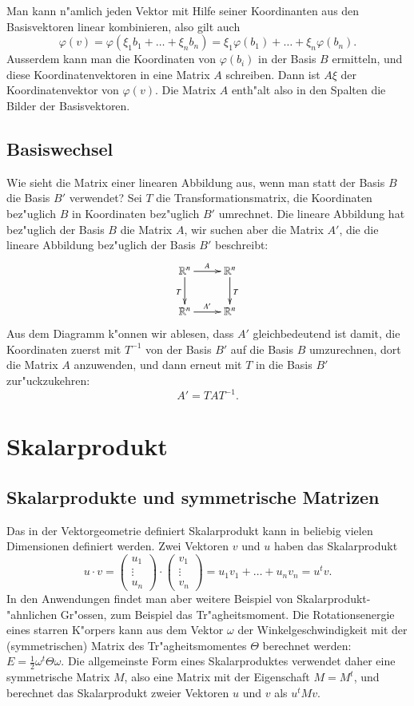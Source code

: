 Man kann n"amlich jeden Vektor mit Hilfe seiner Koordinanten aus
den Basisvektoren linear kombinieren, also gilt auch
\[
\varphi(v)
=
\varphi(\xi_1b_1+\dots+\xi_nb_n)
=
\xi_1\varphi(b_1)+\dots+\xi_n\varphi(b_n).
\]
Ausserdem kann man die Koordinaten von $\varphi(b_i)$ in der Basis
$B$ ermitteln, und diese Koordinatenvektoren in eine Matrix $A$
schreiben. Dann ist $A\xi$ der Koordinatenvektor von $\varphi(v)$.
Die Matrix $A$ enth"alt also in den Spalten die Bilder der Basisvektoren.

\subsection{Basiswechsel}
Wie sieht die Matrix einer linearen Abbildung aus, wenn man statt
der Basis $B$ die Basis $B'$ verwendet? Sei $T$ die Transformationsmatrix,
die Koordinaten bez"uglich $B$ in Koordinaten bez"uglich $B'$ umrechnet.
Die lineare Abbildung hat bez"uglich der Basis $B$ die Matrix $A$, wir
suchen aber die Matrix $A'$, die die lineare Abbildung bez"uglich der
Basis $B'$ beschreibt:
\[
\xymatrix{
\mathbb R^n\ar[r]^{A} \ar[d]_{T}
	&\mathbb R^n \ar[d]^{T}
\\
\mathbb R^n\ar[r]^{A'}
	&\mathbb R^n
}
\]
Aus dem Diagramm k"onnen wir ablesen, dass $A'$ gleichbedeutend
ist damit, die Koordinaten zuerst mit $T^{-1}$ von der Basis $B'$
auf die Basis $B$ umzurechnen, dort die Matrix $A$ anzuwenden, und
dann erneut mit $T$ in die Basis $B'$ zur"uckzukehren:
\begin{equation}
A'=TAT^{-1}.
\label{abbildung-basiswechsel}
\end{equation}

\section{Skalarprodukt}
\subsection{Skalarprodukte und symmetrische Matrizen}
Das in der Vektorgeometrie definiert Skalarprodukt kann in beliebig
vielen Dimensionen definiert werden. Zwei Vektoren $v$ und $u$ haben
das Skalarprodukt
\[
u\cdot v=
\begin{pmatrix}u_1\\\vdots\\u_n\end{pmatrix}
\cdot
\begin{pmatrix}v_1\\\vdots\\v_n\end{pmatrix}
=u_1v_1+\dots+u_nv_n=u^tv.
\]
In den Anwendungen findet man aber weitere Beispiel von
Skalarprodukt-"ahnlichen Gr"ossen, zum Beispiel das Tr"agheitsmoment.
Die Rotationsenergie eines starren K"orpers kann aus dem Vektor $\omega$
der Winkelgeschwindigkeit mit der (symmetrischen) Matrix des
Tr"agheitsmomentes $\Theta$
berechnet werden:
$
E=\frac12 \omega^t\Theta \omega.
$
Die allgemeinste Form eines Skalarproduktes verwendet daher eine
symmetrische Matrix $M$, also eine Matrix mit der Eigenschaft
$M=M^t$, und berechnet das Skalarprodukt zweier Vektoren $u$ und $v$
als $u^tMv$.

